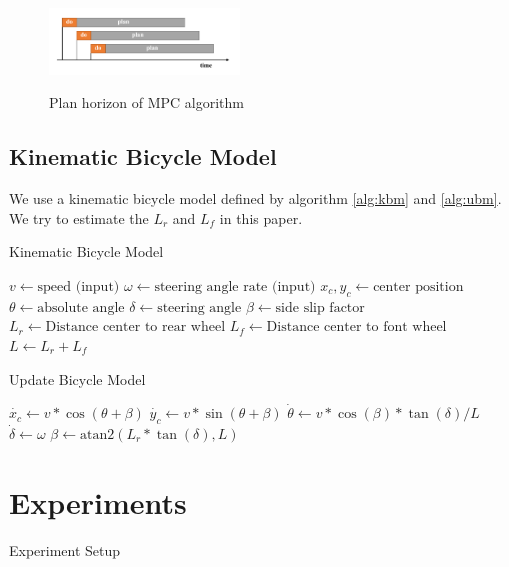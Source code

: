 \documentclass[twoside,twocolumn]{article}
\begin{document}
\begin{figure}[h]
    \caption{Plan horizon of MPC algorithm}
    \centering
    \includegraphics[width=0.45\textwidth]{fig_mpc_plan.pdf}
    \label{fig:mpc_plan}
\end{figure}

\subsection{Kinematic Bicycle Model}

We use a kinematic bicycle model defined by algorithm \ref{alg:kbm} and \ref{alg:ubm}. We try to estimate the $L_r$ and $L_f$ in this paper.
\begin{algorithm}
    \caption{Kinematic Bicycle Model}
    \label{alg:kbm}
    \begin{algorithmic}
        \State $v \gets \text{speed (input)}$
        \State $\omega \gets \text{steering angle rate (input)}$
        \State $x_c, y_c \gets \text{center position}$
        \State $\theta \gets \text{absolute angle}$
        \State $\delta \gets \text{steering angle}$
        \State $\beta \gets \text{side slip factor}$
        \State $L_r \gets \text{Distance center to rear wheel}$
        \State $L_f \gets \text{Distance center to font wheel}$
        \State $L \gets L_r + L_f$
    \end{algorithmic}
\end{algorithm}

\begin{algorithm}
    \caption{Update Bicycle Model}
    \label{alg:ubm}
    \begin{algorithmic}
        \State $\dot{x_c} \gets v * \cos{(\theta + \beta)}$
        \State $\dot{y_c} \gets v * \sin{(\theta + \beta)}$
        \State $\dot{\theta} \gets v * \cos{(\beta)} * \tan{(\delta)} / L$
        \State $\dot{\delta} \gets \omega$
        \State $\beta \gets \text{atan2}(L_r * \tan{(\delta)}, L)$
    \end{algorithmic}
\end{algorithm}

\section{Experiments}

Experiment Setup



\end{document}
